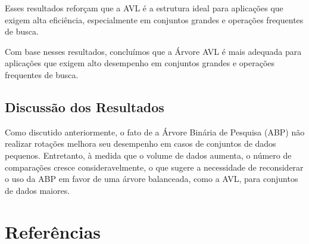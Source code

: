 \documentclass[a4paper, 12pt, english]{article}
\begin{document}
Esses resultados reforçam que a AVL é a estrutura ideal para aplicações que exigem alta eficiência, especialmente em conjuntos grandes e operações frequentes de busca.


Com base nesses resultados, concluímos que a Árvore AVL é mais adequada para aplicações que exigem alto desempenho em conjuntos grandes e operações frequentes de busca.


\subsection{Discussão dos Resultados}
Como discutido anteriormente, o fato de a Árvore Binária de Pesquisa (ABP) não realizar rotações melhora seu desempenho em casos de conjuntos de dados pequenos. Entretanto, à medida que o volume de dados aumenta, o número de comparações cresce consideravelmente, o que sugere a necessidade de reconsiderar o uso da ABP em favor de uma árvore balanceada, como a AVL, para conjuntos de dados maiores.

\newpage
\section{Referências}
\end{document}
